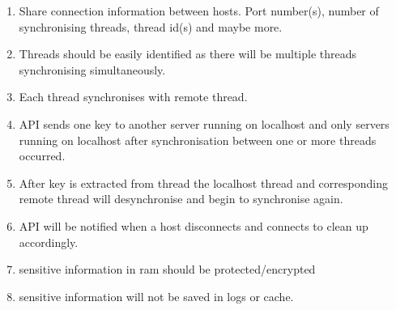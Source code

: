 
\begin{enumerate}

	\item Share connection information between hosts. Port number(s), number of synchronising threads, thread id(s) and maybe more.
	\item Threads should be easily identified as there will be multiple threads synchronising simultaneously. 
	\item Each thread synchronises with remote thread.
	\item API sends one key to another server running on localhost and only servers running on localhost after synchronisation between one or more threads occurred.
	\item After key is extracted from thread the localhost thread and corresponding remote thread will desynchronise and begin to synchronise again.
	\item API will be notified when a host disconnects and connects to clean up accordingly.
	\item sensitive information in ram should be protected/encrypted
	\item sensitive information will not be saved in logs or cache.
	
	
	
	

\end{enumerate}




